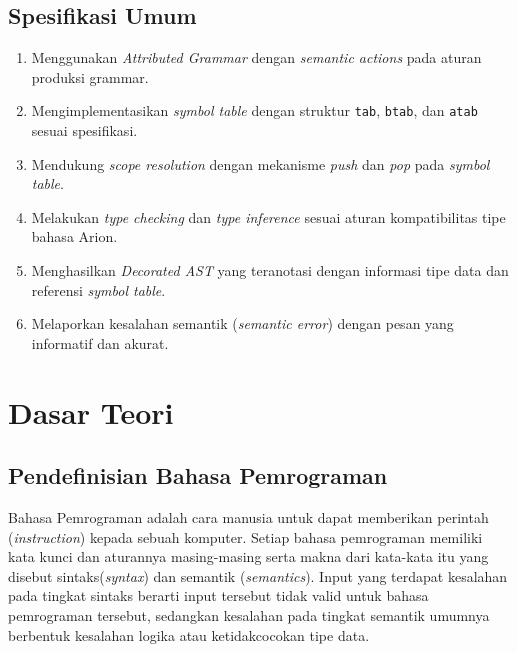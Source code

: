 ﻿\documentclass[12pt,a4paper]{article}
\begin{document}
\subsection{Spesifikasi Umum}

\begin{enumerate}[label=\arabic*.]
  \item Menggunakan \textit{Attributed Grammar} dengan \textit{semantic actions} pada aturan produksi grammar.
  \item Mengimplementasikan \textit{symbol table} dengan struktur \texttt{tab}, \texttt{btab}, dan \texttt{atab} sesuai spesifikasi.
  \item Mendukung \textit{scope resolution} dengan mekanisme \textit{push} dan \textit{pop} pada \textit{symbol table}.
  \item Melakukan \textit{type checking} dan \textit{type inference} sesuai aturan kompatibilitas tipe bahasa Arion.
  \item Menghasilkan \textit{Decorated AST} yang teranotasi dengan informasi tipe data dan referensi \textit{symbol table}.
  \item Melaporkan kesalahan semantik (\textit{semantic error}) dengan pesan yang informatif dan akurat.
\end{enumerate}


\section{Dasar Teori}

\subsection{Pendefinisian Bahasa Pemrograman}
Bahasa Pemrograman adalah cara manusia untuk dapat memberikan perintah
(\textit{instruction}) kepada sebuah komputer. Setiap bahasa pemrograman
memiliki kata kunci dan aturannya masing-masing serta makna dari kata-kata itu
yang disebut sintaks(\textit{syntax}) dan semantik (\textit{semantics}).
Input yang terdapat kesalahan pada tingkat sintaks berarti input tersebut tidak
valid untuk bahasa pemrograman tersebut, sedangkan kesalahan pada tingkat
semantik umumnya berbentuk kesalahan logika atau ketidakcocokan tipe data.
\end{document}

